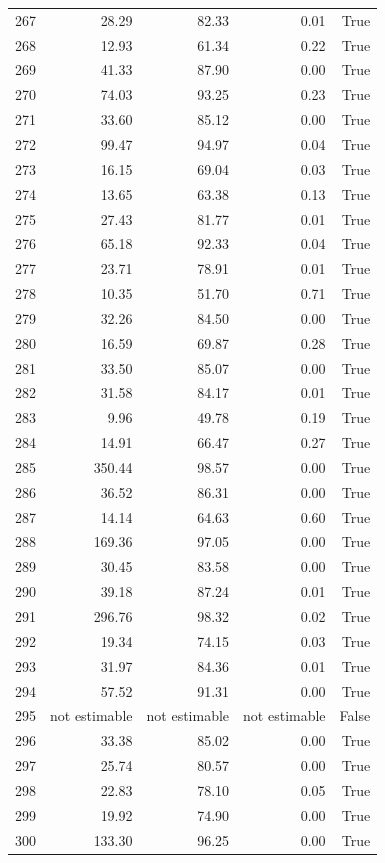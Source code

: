 \begin{longtable}{rrrrr}
267 & 28.29 & 82.33 & 0.01 & True \\
268 & 12.93 & 61.34 & 0.22 & True \\
269 & 41.33 & 87.90 & 0.00 & True \\
270 & 74.03 & 93.25 & 0.23 & True \\
271 & 33.60 & 85.12 & 0.00 & True \\
272 & 99.47 & 94.97 & 0.04 & True \\
273 & 16.15 & 69.04 & 0.03 & True \\
274 & 13.65 & 63.38 & 0.13 & True \\
275 & 27.43 & 81.77 & 0.01 & True \\
276 & 65.18 & 92.33 & 0.04 & True \\
277 & 23.71 & 78.91 & 0.01 & True \\
278 & 10.35 & 51.70 & 0.71 & True \\
279 & 32.26 & 84.50 & 0.00 & True \\
280 & 16.59 & 69.87 & 0.28 & True \\
281 & 33.50 & 85.07 & 0.00 & True \\
282 & 31.58 & 84.17 & 0.01 & True \\
283 & 9.96 & 49.78 & 0.19 & True \\
284 & 14.91 & 66.47 & 0.27 & True \\
285 & 350.44 & 98.57 & 0.00 & True \\
286 & 36.52 & 86.31 & 0.00 & True \\
287 & 14.14 & 64.63 & 0.60 & True \\
288 & 169.36 & 97.05 & 0.00 & True \\
289 & 30.45 & 83.58 & 0.00 & True \\
290 & 39.18 & 87.24 & 0.01 & True \\
291 & 296.76 & 98.32 & 0.02 & True \\
292 & 19.34 & 74.15 & 0.03 & True \\
293 & 31.97 & 84.36 & 0.01 & True \\
294 & 57.52 & 91.31 & 0.00 & True \\
295 & not estimable & not estimable & not estimable & False \\
296 & 33.38 & 85.02 & 0.00 & True \\
297 & 25.74 & 80.57 & 0.00 & True \\
298 & 22.83 & 78.10 & 0.05 & True \\
299 & 19.92 & 74.90 & 0.00 & True \\
300 & 133.30 & 96.25 & 0.00 & True \\

\end{longtable}
